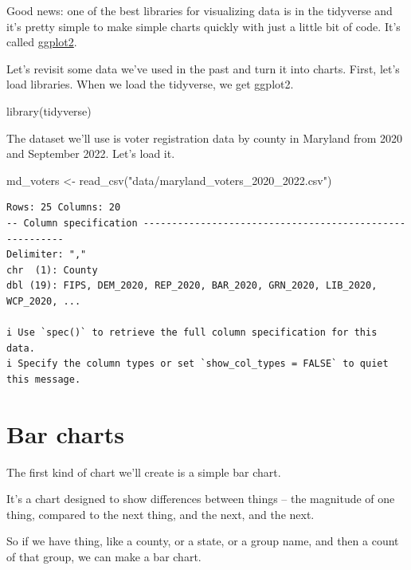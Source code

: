 \documentclass[
  letterpaper,
  DIV=11,
  numbers=noendperiod]{scrreprt}
\newenvironment{Shaded}{\begin{snugshade}}{\end{snugshade}}
\newcommand{\FunctionTok}[1]{\textcolor[rgb]{0.28,0.35,0.67}{#1}}
\newcommand{\NormalTok}[1]{\textcolor[rgb]{0.00,0.23,0.31}{#1}}
\newcommand{\OtherTok}[1]{\textcolor[rgb]{0.00,0.23,0.31}{#1}}
\newcommand{\StringTok}[1]{\textcolor[rgb]{0.13,0.47,0.30}{#1}}
\begin{document}
Good news: one of the best libraries for visualizing data is in the
tidyverse and it's pretty simple to make simple charts quickly with just
a little bit of code. It's called
\href{https://ggplot2.tidyverse.org/}{ggplot2}.

Let's revisit some data we've used in the past and turn it into charts.
First, let's load libraries. When we load the tidyverse, we get ggplot2.

\begin{Shaded}
\begin{Highlighting}[]
\FunctionTok{library}\NormalTok{(tidyverse)}
\end{Highlighting}
\end{Shaded}

The dataset we'll use is voter registration data by county in Maryland
from 2020 and September 2022. Let's load it.

\begin{Shaded}
\begin{Highlighting}[]
\NormalTok{md\_voters }\OtherTok{\textless{}{-}} \FunctionTok{read\_csv}\NormalTok{(}\StringTok{"data/maryland\_voters\_2020\_2022.csv"}\NormalTok{)}
\end{Highlighting}
\end{Shaded}

\begin{verbatim}
Rows: 25 Columns: 20
-- Column specification --------------------------------------------------------
Delimiter: ","
chr  (1): County
dbl (19): FIPS, DEM_2020, REP_2020, BAR_2020, GRN_2020, LIB_2020, WCP_2020, ...

i Use `spec()` to retrieve the full column specification for this data.
i Specify the column types or set `show_col_types = FALSE` to quiet this message.
\end{verbatim}

\hypertarget{bar-charts}{%
\section{Bar charts}\label{bar-charts}}

The first kind of chart we'll create is a simple bar chart.

It's a chart designed to show differences between things -- the
magnitude of one thing, compared to the next thing, and the next, and
the next.

So if we have thing, like a county, or a state, or a group name, and
then a count of that group, we can make a bar chart.
\end{document}
